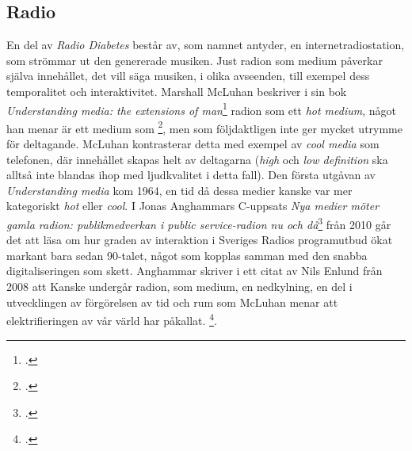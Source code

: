 \documentclass[11pt, a4paper]{article} %
\begin{document}
\subsection*{Radio}
En del av \emph{Radio Diabetes} består av, som namnet antyder, en internetradiostation, som strömmar ut den genererade musiken. Just radion som medium påverkar själva innehållet, det vill säga musiken, i olika avseenden, till exempel dess temporalitet och interaktivitet. Marshall McLuhan beskriver i sin bok \emph{Understanding media: the extensions of man}\footcite{mcluhan_understanding_2003} radion som ett \emph{hot medium}, något han menar är ett medium som \footcite[39]{mcluhan_understanding_2003}, men som följdaktligen inte ger mycket utrymme för deltagande. McLuhan kontrasterar detta med exempel av \emph{cool media} som telefonen, där innehållet skapas helt av deltagarna (\emph{high} och \emph{low definition} ska alltså inte blandas ihop med ljudkvalitet i detta fall). Den första utgåvan av \emph{Understanding media} kom 1964, en tid då dessa medier kanske var mer kategoriskt \emph{hot} eller \emph{cool}. I Jonas Anghammars C-uppsats \emph{Nya medier möter gamla radion: publikmedverkan i public service-radion nu och då}\footcite{anghammar_nya_2010} från 2010 går det att läsa om hur graden av interaktion i Sveriges Radios programutbud ökat markant bara sedan 90-talet, något som kopplas samman med den snabba digitaliseringen som skett. Anghammar skriver i ett citat av Nils Enlund från 2008 att  Kanske undergår radion, som medium, en nedkylning, en del i utvecklingen av förgörelsen av tid och rum som McLuhan menar att elektrifieringen av vår värld har påkallat. \footcite[454]{mcluhan_understanding_2003}.


\end{document}
